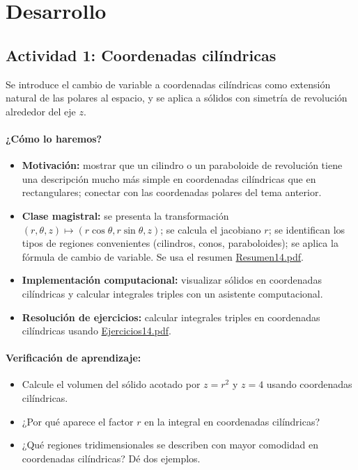 \documentclass[a4,11pt]{aleph-notas}
\begin{document}
\section*{Desarrollo}

\subsection*{Actividad 1: Coordenadas cilíndricas}
Se introduce el cambio de variable a coordenadas cilíndricas como extensión natural de las polares al espacio, y se aplica a sólidos con simetría de revolución alrededor del eje $z$.

\paragraph{¿Cómo lo haremos?}
\begin{itemize}[leftmargin=*]
    \item \textbf{Motivación:} mostrar que un cilindro o un paraboloide de revolución tiene una descripción mucho más simple en coordenadas cilíndricas que en rectangulares; conectar con las coordenadas polares del tema anterior.
    \item \textbf{Clase magistral:} se presenta la transformación $(r,\theta,z)\mapsto(r\cos\theta,r\sin\theta,z)$; se calcula el jacobiano $r$; se identifican los tipos de regiones convenientes (cilindros, conos, paraboloides); se aplica la fórmula de cambio de variable. Se usa el resumen \href{https://andres-merino.github.io/MatematicaIII-05-N0051/01Resumen/Resumen14.pdf}{Resumen14.pdf}.
    \item \textbf{Implementación computacional:} visualizar sólidos en coordenadas cilíndricas y calcular integrales triples con un asistente computacional.
    \item \textbf{Resolución de ejercicios:} calcular integrales triples en coordenadas cilíndricas usando \href{https://andres-merino.github.io/MatematicaIII-05-N0051/04Ejercicios/Ejercicios14.pdf}{Ejercicios14.pdf}.
\end{itemize}

\paragraph{Verificación de aprendizaje:}
\begin{itemize}[leftmargin=*]
    \item Calcule el volumen del sólido acotado por $z=r^2$ y $z=4$ usando coordenadas cilíndricas.
    \item ¿Por qué aparece el factor $r$ en la integral en coordenadas cilíndricas?
    \item ¿Qué regiones tridimensionales se describen con mayor comodidad en coordenadas cilíndricas? Dé dos ejemplos.
\end{itemize}
\end{document}
